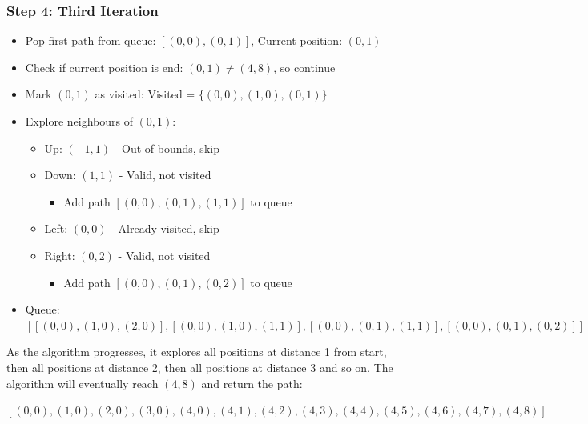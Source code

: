 \subsubsection{Step 4: Third Iteration}
\begin{itemize}
    \item Pop first path from queue: $[(0,0), (0,1)]$, Current position: $(0,1)$
    \item Check if current position is end: $(0,1) \neq (4,8)$, so continue
    \item Mark $(0,1)$ as visited: Visited = $\{(0,0), (1,0), (0,1)\}$
    \item Explore neighbours of $(0,1)$:
    \begin{itemize}
        \item Up: $(-1,1)$ - Out of bounds, skip
        \item Down: $(1,1)$ - Valid, not visited
        \begin{itemize}
            \item Add path $[(0,0), (0,1), (1,1)]$ to queue
        \end{itemize}
        \item Left: $(0,0)$ - Already visited, skip
        \item Right: $(0,2)$ - Valid, not visited
        \begin{itemize}
            \item Add path $[(0,0), (0,1), (0,2)]$ to queue
        \end{itemize}
    \end{itemize}
    \item Queue: $[[(0,0), (1,0), (2,0)], [(0,0), (1,0), (1,1)], [(0,0), (0,1), (1,1)], [(0,0), (0,1), (0,2)]]$
\end{itemize}

As the algorithm progresses, it explores all positions at distance 1 from start, then all positions at distance 2, then all positions at distance 3 and so on. The algorithm will eventually reach $(4,8)$ and return the path:
\begin{center}
$[(0,0), (1,0), (2,0), (3,0), (4,0), (4,1), (4,2), (4,3), (4,4), (4,5), (4,6), (4,7), (4,8)]$
\end{center}


